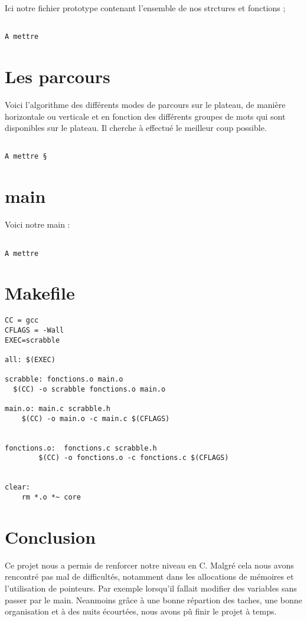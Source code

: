 \documentclass[a4paper]{article}
\begin{document}
Ici notre fichier prototype contenant l'ensemble de nos strctures et fonctions ;
\begin{verbatim}

A mettre 

\end{verbatim}

\section{Les parcours}

Voici l'algorithme des différents modes de parcours sur le plateau, de manière horizontale ou verticale et en fonction des différents groupes de mots qui sont disponibles sur le plateau. Il cherche à effectué le meilleur coup possible.

\begin{verbatim}

A mettre §

\end{verbatim}


\section{main}

Voici notre main  : 

\begin{verbatim}

A mettre
\end{verbatim}

\section{Makefile}


\begin{verbatim}
CC = gcc
CFLAGS = -Wall
EXEC=scrabble

all: $(EXEC)

scrabble: fonctions.o main.o
  $(CC) -o scrabble fonctions.o main.o

main.o: main.c scrabble.h
    $(CC) -o main.o -c main.c $(CFLAGS)


fonctions.o:  fonctions.c scrabble.h
        $(CC) -o fonctions.o -c fonctions.c $(CFLAGS)


clear:  
    rm *.o *~ core

\end{verbatim}


\color{red}
\section{Conclusion}

Ce projet nous a permis de renforcer notre niveau en C. Malgré cela nous avons rencontré pas mal de difficultés, notamment dans les allocations de mémoires et l'utilisation de pointeurs. Par exemple lorsqu'il fallait modifier des variables sans passer par le main. Neanmoins grâce à une bonne répartion des taches, une bonne organisation et à des nuits écourtées, nous avons pû finir le projet à temps.
\end{document}

